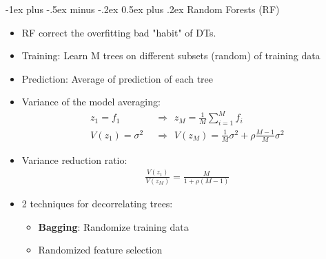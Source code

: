 \documentclass[10pt,a4paper,landscape]{article}
\makeatletter
\renewcommand{\section}{\@startsection{section}{1}{0mm}%
                                {-1ex plus -.5ex minus -.2ex}%
                                {0.5ex plus .2ex}%
                                {\normalfont\tiny\bfseries}}
\makeatother
\begin{document}
\begin{multicols*}{5}
\section{Random Forests (RF)}
\begin{itemize}
    \item RF correct the overfitting bad "habit" of DTs.
    \item Training: Learn M trees on different subsets (random) of training data
    \item Prediction: Average of prediction of each tree
    \item Variance of the model averaging:
    \begin{align*}
        z_1 = f_1 \hspace{5pt} &\Rightarrow \hspace{5pt} z_M = \frac{1}{M} \sum_{i = 1}^M f_i \\
        V(z_1) = \sigma^2 \hspace{5pt} &\Rightarrow \hspace{5pt} V(z_M) = \frac{1}{M} \sigma^2 + \rho \frac{M - 1}{M} \sigma^2
    \end{align*}
    \item Variance reduction ratio:
    \begin{align*}
        \frac{V(z_1)}{V(z_M)} = \frac{M}{1 +\rho (M - 1)}
    \end{align*}
    \item 2 techniques for decorrelating trees:
    \begin{itemize}
        \item \textbf{Bagging}: Randomize training data
        \item Randomized feature selection
    \end{itemize}
\end{itemize}





\end{multicols*}
\end{document}
